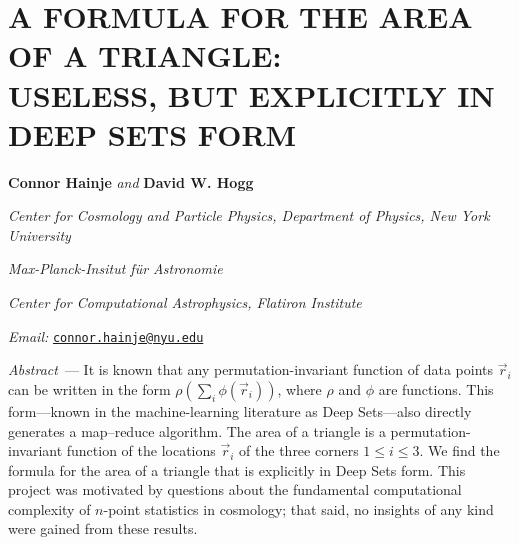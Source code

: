\documentclass[10pt]{article}
\renewcommand{\paragraph}[1]{\par\addvspace{1.5ex}\noindent\textsl{#1}~---}
\newcommand{\aOne}{\textsuperscript{\textasteriskcentered}}
\newcommand{\aTwo}{\textsuperscript{\textdagger}}
\newcommand{\aThree}{\textsuperscript{\textdaggerdbl}}
\newcommand{\aFour}{\textsuperscript{\textsection}}
\newcommand{\aFive}{\textsuperscript{\textbardbl}}
\newcommand{\aSix}{\textsuperscript{\textparagraph}}
\begin{document}
\thispagestyle{empty}\setcounter{secnumdepth}{0}

\section*{\centering\normalsize\uppercase{
A formula for the area of a triangle:\\
Useless, but explicitly in Deep Sets form}}

\medskip
\noindent
\textbf{Connor Hainje}\aOne\aSix{}
\textsl{and}
\textbf{David W. Hogg}\aOne\aTwo\aThree%

\medskip
{\footnotesize\par\noindent \aOne\textsl{
Center for Cosmology and Particle Physics, Department of Physics, New York University}}
{\footnotesize\par\noindent \aTwo\textsl{
Max-Planck-Insitut f\"ur Astronomie}}
{\footnotesize\par\noindent \aThree\textsl{
Center for Computational Astrophysics, Flatiron Institute}}
{\footnotesize\par\noindent \aSix\textsl{
Email:} \texttt{\href{mailto:connor.hainje@nyu.edu}{connor.hainje@nyu.edu}}}
{\footnotesize\par}  %

\medskip
\paragraph{Abstract}
It is known that any permutation-invariant function of data points $\vec{r}_i$
can be written in the form $\rho(\sum_i\phi(\vec{r}_i))$,
where $\rho$ and $\phi$ are functions.
This form---known in the machine-learning literature as Deep Sets---also directly generates a map--reduce algorithm.
The area of a triangle is a permutation-invariant function of the locations $\vec{r}_i$ of the three corners $1\leq i\leq 3$.
We find the formula for the area of a triangle that is explicitly in Deep Sets form.
This project was motivated by questions about the fundamental computational complexity of $n$-point statistics in cosmology; that said, no insights of any kind were gained from these results.
\end{document}

